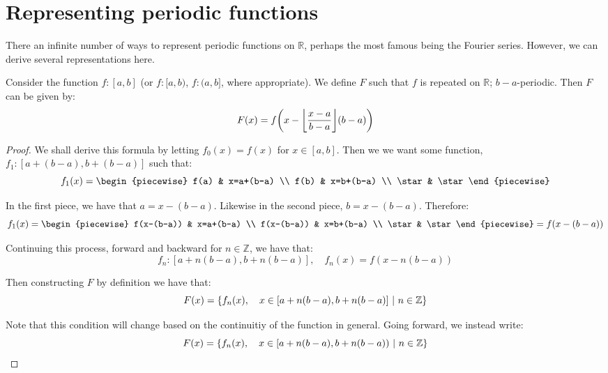 \section{Representing periodic functions}
There an infinite number of ways to represent periodic functions on $\mathbb{R}$, perhaps the most famous being the Fourier series. However, we can derive several representations here.

\begin{theorem}
    Consider the function $f:[a,b]$ (or $f:[a,b)$, $f:(a,b]$, where appropriate). We define $F$ such that $f$ is repeated on $\mathbb{R}$; $b-a$-periodic. Then $F$ can be given by:
    $$
        F(x) = f\paren*{x-\floor*{\frac{x-a}{b-a}}(b-a)}
    $$

    \begin{proof}
        \label{proof:periodic_proof}
        We shall derive this formula by letting $f_0(x)=f(x)$ for $x\in [a,b]$. Then we we want some function, $f_1:[a+(b-a),b+(b-a)]$ such that:
        $$
            f_1(x) = \begin{piecewise}
                f(a) & x=a+(b-a) \\
                f(b) & x=b+(b-a) \\
                \star & \star
            \end{piecewise}
        $$

        In the first piece, we have that $a=x-(b-a)$. Likewise in the second piece, $b=x-(b-a)$. Therefore:
        $$
            f_1(x) = \begin{piecewise}
                f(x-(b-a)) & x=a+(b-a) \\
                f(x-(b-a)) & x=b+(b-a) \\
                \star & \star
            \end{piecewise} = f(x-(b-a))
        $$

        Continuing this process, forward and backward for $n\in\mathbb{Z}$, we have that:
        $$
            f_n:[a+n(b-a),b+n(b-a)],\quad f_n(x) = f(x-n(b-a))
        $$

        Then constructing $F$ by definition we have that:
        $$
            F(x) = \left\{f_n(x),\quad x\in[a+n(b-a),b+n(b-a)]\ \middle|\ n\in\mathbb{Z}\right\}
        $$

        Note that this condition will change based on the continuitiy of the function in general. Going forward, we instead write:
        $$
            F(x) = \left\{f_n(x),\quad x\in[a+n(b-a),b+n(b-a))\ \middle|\ n\in\mathbb{Z}\right\}
        $$


\end{proof}
\end{theorem}

